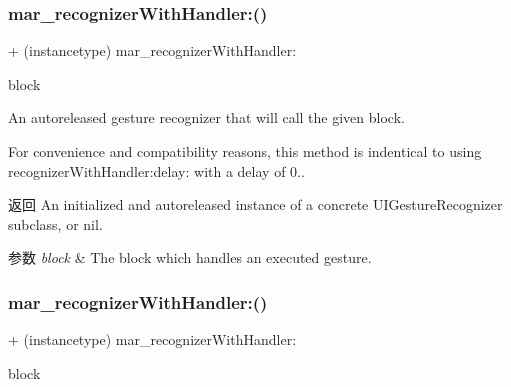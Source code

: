 \subsubsection{\texorpdfstring{mar\+\_\+recognizer\+With\+Handler\+:()}{mar\_recognizerWithHandler:()}\hspace{0.1cm}{\footnotesize\ttfamily [1/2]}}
{\footnotesize\ttfamily + (instancetype) mar\+\_\+recognizer\+With\+Handler\+: \begin{DoxyParamCaption}\item[{(void($^\wedge$)(U\+I\+Gesture\+Recognizer $\ast$sender, U\+I\+Gesture\+Recognizer\+State state, C\+G\+Point location))}]{block }\end{DoxyParamCaption}}

An autoreleased gesture recognizer that will call the given block.

For convenience and compatibility reasons, this method is indentical to using recognizer\+With\+Handler\+:delay\+: with a delay of 0..

\begin{DoxyReturn}{返回}
An initialized and autoreleased instance of a concrete U\+I\+Gesture\+Recognizer subclass, or {\ttfamily nil}. 
\end{DoxyReturn}

\begin{DoxyParams}{参数}
{\em block} & The block which handles an executed gesture. \\
\hline
\end{DoxyParams}
\mbox{\label{category_u_i_gesture_recognizer_07_m_a_r_e_x___block_08_ac772310915a3eea3bd1eac13807beed4}} 
\subsubsection{\texorpdfstring{mar\+\_\+recognizer\+With\+Handler\+:()}{mar\_recognizerWithHandler:()}\hspace{0.1cm}{\footnotesize\ttfamily [2/2]}}
{\footnotesize\ttfamily + (instancetype) mar\+\_\+recognizer\+With\+Handler\+: \begin{DoxyParamCaption}\item[{(void($^\wedge$)(U\+I\+Gesture\+Recognizer $\ast$ \+\_\+\+Nonnull, U\+I\+Gesture\+Recognizer\+State, C\+G\+Point))}]{block }\end{DoxyParamCaption}\hspace{0.3cm}{\ttfamily [implementation]}}

